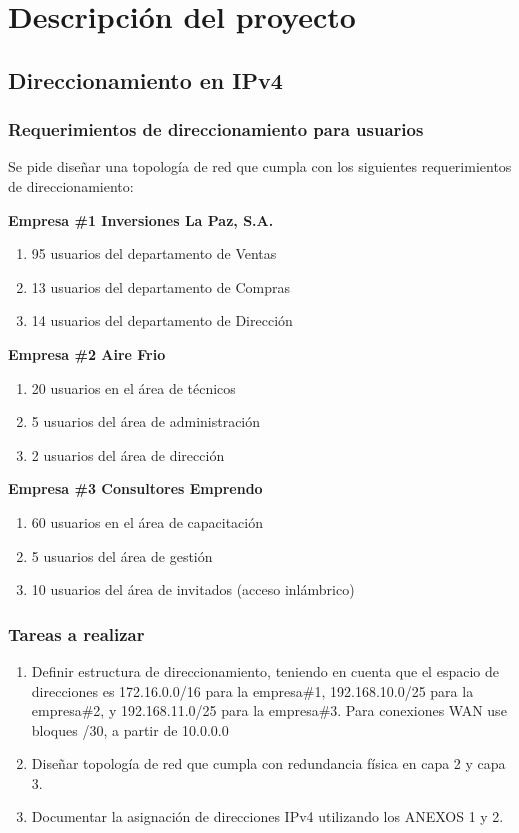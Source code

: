 \documentclass[12pt]{article}
\begin{document}
\section{Descripción del proyecto}
\subsection{Direccionamiento en IPv4}
\subsubsection{Requerimientos de direccionamiento para usuarios}
Se pide diseñar una topología de red que cumpla con los siguientes requerimientos de direccionamiento:

\textbf{Empresa \#1 Inversiones La Paz, S.A.}
\begin{enumerate}
\item 95 usuarios del departamento de Ventas
\item 13 usuarios del departamento de Compras
\item 14 usuarios del departamento de Dirección
\end{enumerate}

\textbf{Empresa \#2 Aire Frio}
\begin{enumerate}
\item 20 usuarios en el área de técnicos
\item 5 usuarios del área de administración
\item 2 usuarios del área de dirección
\end{enumerate}

\textbf{Empresa \#3 Consultores Emprendo}
\begin{enumerate}
\item 60 usuarios en el área de capacitación
\item 5 usuarios del área de gestión
\item 10 usuarios del área de invitados (acceso inlámbrico)
\end{enumerate}

\subsubsection{Tareas a realizar}
\begin{enumerate}
\item Definir estructura de direccionamiento, teniendo en cuenta que el espacio de direcciones es 172.16.0.0/16 para la empresa\#1, 192.168.10.0/25 para la empresa\#2, y 192.168.11.0/25 para la empresa\#3. Para conexiones WAN use bloques /30, a partir de 10.0.0.0
\item Diseñar topología de red que cumpla con redundancia física en capa 2 y capa 3.
\item Documentar la asignación de direcciones IPv4 utilizando los ANEXOS 1 y 2.
\end{enumerate}
\end{document}
